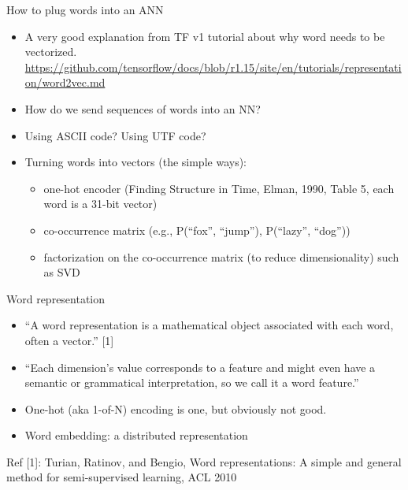 \documentclass[10pt]{beamer}
\begin{document}
\begin{frame}{How to plug words into an ANN}
 \begin{itemize}[<+->]
  \item A very good explanation from TF v1 tutorial about why word needs to be vectorized.
  \url{https://github.com/tensorflow/docs/blob/r1.15/site/en/tutorials/representation/word2vec.md}
  \item How do we send sequences of words into an NN? 
  \item Using ASCII code? Using UTF code? 
  \item Turning words into vectors (the simple ways):
  \begin{itemize}
   \item one-hot encoder (Finding Structure in Time, Elman, 1990, Table 5, each word is a 31-bit vector)
   \item co-occurrence matrix (e.g., P(``fox'', ``jump''), P(``lazy'', ``dog''))
   \item factorization on the co-occurrence matrix (to reduce dimensionality) such as SVD
  \end{itemize}
 \end{itemize}
\end{frame}

\begin{frame}{Word representation}
\begin{itemize}
 \item ``A word representation is a mathematical object
         associated with each word, often a vector.'' [1]
 \item ``Each dimension's value corresponds to a feature and
         might even have a semantic or grammatical
         interpretation, so we call it a word feature.''
 \item One-hot (aka 1-of-N) encoding is one, but obviously not good. 
 \item Word embedding: a distributed representation 
\end{itemize}
Ref [1]: Turian, Ratinov, and Bengio, Word representations:
A simple and general method for semi-supervised learning, ACL 2010
\end{frame}
\end{document}
